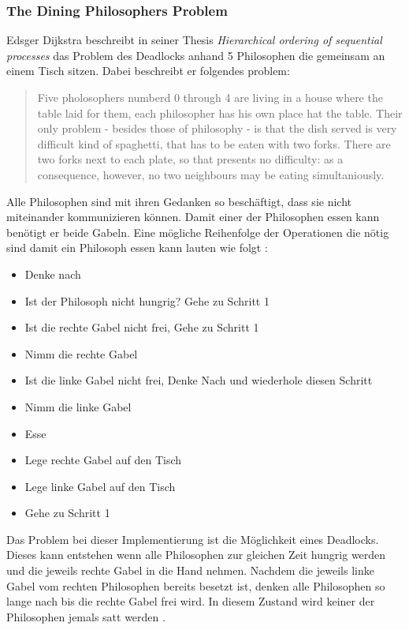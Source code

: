 \subsubsection{The Dining Philosophers Problem}

Edsger Dijkstra beschreibt in seiner Thesis \emph{Hierarchical ordering of sequential processes} das Problem des Deadlocks anhand 5 Philosophen die gemeinsam an einem Tisch sitzen. Dabei beschreibt er folgendes problem:

\begin{quote}
	Five pholosophers numberd 0 through 4 are living in a house where the table laid for them, each philosopher has his own place hat the table. Their only problem - besides those of philosophy - is that the dish served is very difficult kind of spaghetti, that has to be eaten with two forks. There are two forks next to each plate, so that presents no difficulty: as a consequence, however, no two neighbours may be eating simultaniously. \cite[p. 21]{dij71}
\end{quote} 

Alle Philosophen sind mit ihren Gedanken so beschäftigt, dass sie nicht miteinander kommunizieren können. Damit einer der Philosophen essen kann benötigt er beide Gabeln. Eine mögliche Reihenfolge der Operationen die nötig sind damit ein Philosoph essen kann lauten wie folgt \cite[p. 21]{dij71}:

\begin{itemize}
  \item Denke nach
  \item Ist der Philosoph nicht hungrig? Gehe zu Schritt 1
  \item Ist die rechte Gabel nicht frei, Gehe zu Schritt 1
  \item Nimm die rechte Gabel
  \item Ist die linke Gabel nicht frei, Denke Nach und wiederhole diesen Schritt
  \item Nimm die linke Gabel
  \item Esse
  \item Lege rechte Gabel auf den Tisch  
  \item Lege linke Gabel auf den Tisch
  \item Gehe zu Schritt 1
\end{itemize}

Das Problem bei dieser Implementierung ist die Möglichkeit eines Deadlocks. Dieses kann entstehen wenn alle Philosophen zur gleichen Zeit hungrig werden und die jeweils rechte Gabel in die Hand nehmen. Nachdem die jeweils linke Gabel vom rechten Philosophen bereits besetzt ist, denken alle Philosophen so lange nach bis die rechte Gabel frei wird. In diesem Zustand wird keiner der Philosophen jemals satt werden \cite[p. 21]{dij71}. 

